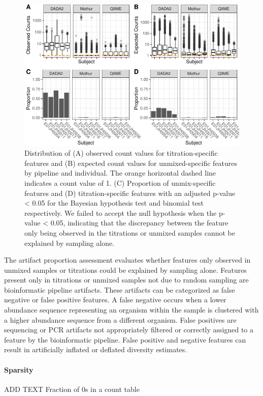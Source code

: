 \documentclass[linenumbers]{bmcart}
\begin{document}
\begin{figure}
\centering
\includegraphics{qualPlot-1.pdf}
\caption{\label{fig:qualPlot}Distribution of (A) observed count values for
titration-specific features and (B) expected count values for
unmixed-specific features by pipeline and individual. The orange
horizontal dashed line indicates a count value of 1. (C) Proportion of
unmix-specific features and (D) titration-specific features with an
adjusted p-value \textless{} 0.05 for the Bayesian hypothesis test and
binomial test respectively. We failed to accept the null hypothesis when
the p-value \textless{} 0.05, indicating that the discrepancy between
the feature only being observed in the titrations or unmixed samples
cannot be explained by sampling alone.}
\end{figure}

The artifact proportion assessment evaluates whether features only observed in
unmixed samples or titrations could be explained by sampling alone.
Features present only in titrations or unmixed samples not due to random
sampling are bioinformatic pipeline artifacts. These artifacts can be
categorized as false negative or false positive features. A false
negative occurs when a lower abundance sequence representing an organism
within the sample is clustered with a higher abundance sequence from a
different organism. False positives are sequencing or PCR artifacts not
appropriately filtered or correctly assigned to a feature by the
bioinformatic pipeline.
False positive and negative features can result in artificially inflated or deflated diversity estimates.

\paragraph{Sparsity}
ADD TEXT
Fraction of 0s in a count table
\end{document}
